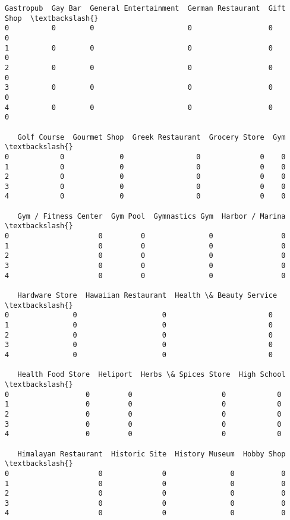 \documentclass[11pt]{article}
\begin{document}
\begin{tcolorbox}[breakable, size=fbox, boxrule=.5pt, pad at break*=1mm, opacityfill=0]
\begin{Verbatim}[commandchars=\\\{\}]
   Gastropub  Gay Bar  General Entertainment  German Restaurant  Gift Shop  \textbackslash{}
0          0        0                      0                  0          0
1          0        0                      0                  0          0
2          0        0                      0                  0          0
3          0        0                      0                  0          0
4          0        0                      0                  0          0

   Golf Course  Gourmet Shop  Greek Restaurant  Grocery Store  Gym  \textbackslash{}
0            0             0                 0              0    0
1            0             0                 0              0    0
2            0             0                 0              0    0
3            0             0                 0              0    0
4            0             0                 0              0    0

   Gym / Fitness Center  Gym Pool  Gymnastics Gym  Harbor / Marina  \textbackslash{}
0                     0         0               0                0
1                     0         0               0                0
2                     0         0               0                0
3                     0         0               0                0
4                     0         0               0                0

   Hardware Store  Hawaiian Restaurant  Health \& Beauty Service  \textbackslash{}
0               0                    0                        0
1               0                    0                        0
2               0                    0                        0
3               0                    0                        0
4               0                    0                        0

   Health Food Store  Heliport  Herbs \& Spices Store  High School  \textbackslash{}
0                  0         0                     0            0
1                  0         0                     0            0
2                  0         0                     0            0
3                  0         0                     0            0
4                  0         0                     0            0

   Himalayan Restaurant  Historic Site  History Museum  Hobby Shop  \textbackslash{}
0                     0              0               0           0
1                     0              0               0           0
2                     0              0               0           0
3                     0              0               0           0
4                     0              0               0           0


\end{Verbatim}
\end{tcolorbox}
\end{document}
